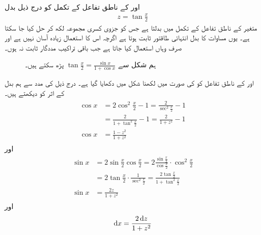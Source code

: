 \\
 اور  کے ناطق تفاعل کے تکمل کو درج ذیل بدل
\begin{align}\label{مساوات_طریقہ_ٹینجنٹ_بدل}
z=\tan\frac{x}{2}
\end{align}
متغیر  کے ناطق تفاعل کے تکمل میں بدلتا ہے جس کو جزوی کسری مجموعہ لکھ کر حل کیا جا سکتا ہے۔ یوں مساوات  کا بدل انتہائی طاقتور ثابت ہوتا ہے اگرچہ اس کا استعمال زیادہ آسان نہیں ہے اور صرف وہاں استعمال کیا جاتا ہے جب باقی تراکیب مددگار ثابت نہ ہوں۔

\begin{figure}
\centering
{}
\caption{ہم شکل سے $\tan\tfrac{x}{2}=\tfrac{\sin x}{1+\cos x}$ پڑھ سکتے ہیں۔}
\label{شکل_طریقہ_سوال_بدل_ٹینجنٹ}
\end{figure}
 اور  کے ناطق تفاعل کو  کی صورت میں لکھنا شکل  میں دکھایا گیا ہے۔ درج ذیل کی مدد سے ہم بدل کے اثر کو دیکھتے ہیں۔
\begin{gather}
\begin{aligned}\label{مساوات_طریقہ_ٹینجنٹ_بدل_الف}
\cos x&=2\cos^2\frac{x}{2}-1=\frac{2}{\sec^2\frac{x}{2}}-1\\
&=\frac{2}{1+\tan^2\frac{x}{2}}-1=\frac{2}{1+z^2}-1\\
\cos x&=\frac{1-z^2}{1+z^2}
\end{aligned}
\end{gather}
اور
\begin{gather}
\begin{aligned}\label{مساوات_طریقہ_ٹینجنٹ_بدل_ب}
\sin x&=2\sin\frac{x}{2}\cos\frac{x}{2}=2\frac{\sin\frac{x}{2}}{\cos\frac{x}{2}}\cdot\cos^2\frac{x}{2}\\
&=2\tan\frac{x}{2}\cdot\frac{1}{\sec^2\frac{x}{2}}=\frac{2\tan\frac{x}{2}}{1+\tan^2\frac{x}{2}}\\
\sin x&=\frac{2z}{1+z^2}
\end{aligned}
\end{gather}
اور
\begin{align}\label{مساوات_طریقہ_ٹینجنٹ_بدل_پ}
\dif x=\frac{2\dif z}{1+z^2}
\end{align}

